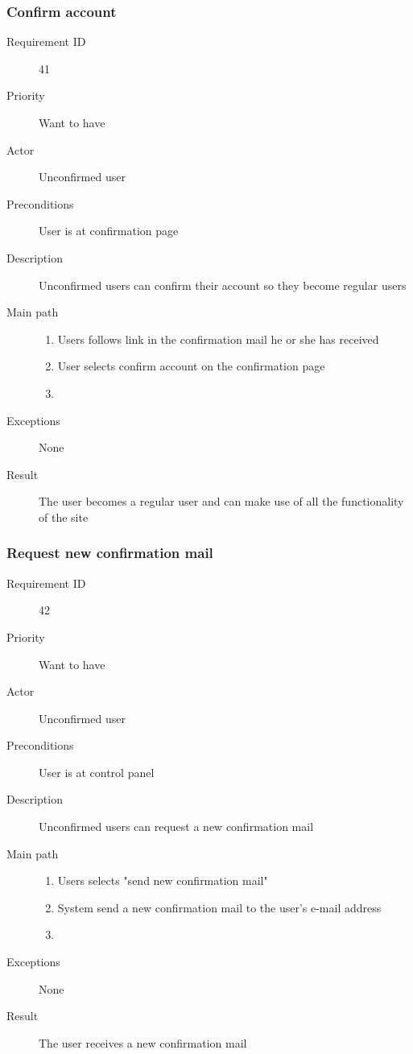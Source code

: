 		\subsubsection{Confirm account}
			\begin{description}
				\item[Requirement ID] 41
				\item[Priority] Want to have
				\item[Actor] Unconfirmed user
				\item[Preconditions] User is at confirmation page
				\item[Description] Unconfirmed users can confirm their account so they become regular users
				\item[Main path]
 					\begin{enumerate}
						\item Users follows link in the confirmation mail he or she has received
						\item User selects confirm account on the confirmation page
						\item 
					\end{enumerate}
				\item[Exceptions] None
				\item[Result] The user becomes a regular user and can make use of all the functionality of the site
			\end{description}
		\subsubsection{Request new confirmation mail}
			\begin{description}
				\item[Requirement ID] 42
				\item[Priority] Want to have
				\item[Actor] Unconfirmed user
				\item[Preconditions] User is at control panel
				\item[Description] Unconfirmed users can request a new confirmation mail
				\item[Main path]
 					\begin{enumerate}
						\item Users selects "send new confirmation mail"
						\item System send a new confirmation mail to the user's e-mail address
						\item 
					\end{enumerate}
				\item[Exceptions] None
				\item[Result] The user receives a new confirmation mail
			\end{description}

